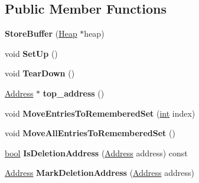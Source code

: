 \subsection*{Public Member Functions}
\begin{DoxyCompactItemize}
\item 
\mbox{\label{classv8_1_1internal_1_1StoreBuffer_afeb036a2c6157abd9b20c2b8ffa28052}} 
{\bfseries Store\+Buffer} (\mbox{\hyperlink{classv8_1_1internal_1_1Heap}{Heap}} $\ast$heap)
\item 
\mbox{\label{classv8_1_1internal_1_1StoreBuffer_a031dcd4df4a4c83bcb856c70ec4e4fbc}} 
void {\bfseries Set\+Up} ()
\item 
\mbox{\label{classv8_1_1internal_1_1StoreBuffer_ad05bd8e03f20976385f7308304792398}} 
void {\bfseries Tear\+Down} ()
\item 
\mbox{\label{classv8_1_1internal_1_1StoreBuffer_ab4b8b19cb1c629044f1c17e028b4f1ab}} 
\mbox{\hyperlink{classuintptr__t}{Address}} $\ast$ {\bfseries top\+\_\+address} ()
\item 
\mbox{\label{classv8_1_1internal_1_1StoreBuffer_a7ae6b3df7f8a32d16612cee4753194d9}} 
void {\bfseries Move\+Entries\+To\+Remembered\+Set} (\mbox{\hyperlink{classint}{int}} index)
\item 
\mbox{\label{classv8_1_1internal_1_1StoreBuffer_a7b18f45d6fd75adb721102db5393a7e0}} 
void {\bfseries Move\+All\+Entries\+To\+Remembered\+Set} ()
\item 
\mbox{\label{classv8_1_1internal_1_1StoreBuffer_a5b5ee52821ddc25539c09b500134d989}} 
\mbox{\hyperlink{classbool}{bool}} {\bfseries Is\+Deletion\+Address} (\mbox{\hyperlink{classuintptr__t}{Address}} address) const
\item 
\mbox{\label{classv8_1_1internal_1_1StoreBuffer_ae03b9d127f03c9dc9dffaa1780cf31ba}} 
\mbox{\hyperlink{classuintptr__t}{Address}} {\bfseries Mark\+Deletion\+Address} (\mbox{\hyperlink{classuintptr__t}{Address}} address)

\end{DoxyCompactItemize}
